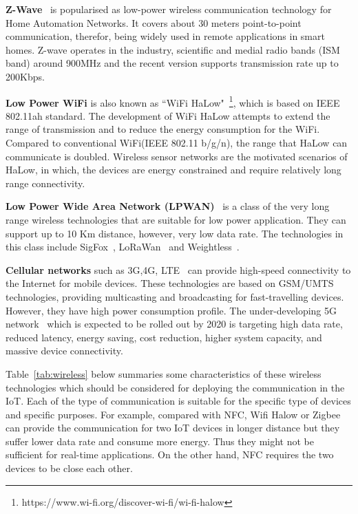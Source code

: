 \textbf{Z-Wave}~\citep{Alliance:2013} is popularised as low-power wireless communication technology for Home Automation Networks.
It covers about 30 meters point-to-point communication, therefor, being widely used in remote applications in smart homes.
Z-wave operates in the industry, scientific and medial radio bands (ISM band) around 900MHz and the recent version supports transmission rate up to 200Kbps.

\textbf{Low Power WiFi} is also known as ``WiFi HaLow"~\footnote{https://www.wi-fi.org/discover-wi-fi/wi-fi-halow}, which is based on IEEE 802.11ah standard.
The development of WiFi HaLow attempts to extend the range of transmission and to reduce the energy consumption for the WiFi.
Compared to conventional WiFi(IEEE 802.11 b/g/n), the range that HaLow can communicate is doubled.
Wireless sensor networks are the motivated scenarios of HaLow, in which, the devices are energy constrained and require relatively long range connectivity. 

\textbf{Low Power Wide Area Network (LPWAN)}~\citep{Bardyn:2016}  is a class of the very long range wireless technologies that are suitable for low power application. They can support up to 10 Km distance, however, very low data rate. The technologies in this class include SigFox~\citep{zuniga:2016}, LoRaWan~\citep{Lora:2015} and Weightless~\citep{Webb:2012}. 

\textbf{Cellular networks} such as 3G,4G, LTE~\citep{Dahlman:2013} can provide high-speed connectivity to the Internet for mobile devices. These technologies are based on GSM/UMTS technologies, providing multicasting and broadcasting for fast-travelling devices.
However, they have high power consumption profile.
The under-developing 5G network~\citep{Li:2018} which is expected to be rolled out by 2020 is targeting high data rate, reduced latency, energy saving, cost reduction, higher system capacity, and massive device connectivity.

Table~\ref{tab:wireless} below summaries some characteristics of these wireless technologies which should be considered for deploying the communication in the IoT.  
Each of the type of communication is suitable for the specific type of devices and specific purposes.
For example, compared with NFC, Wifi Halow or Zigbee can provide the communication for two IoT devices in longer distance but they suffer lower data rate and consume more energy.
Thus they might not be sufficient for real-time applications. 
On the other hand, NFC requires the two devices to be close each other.

